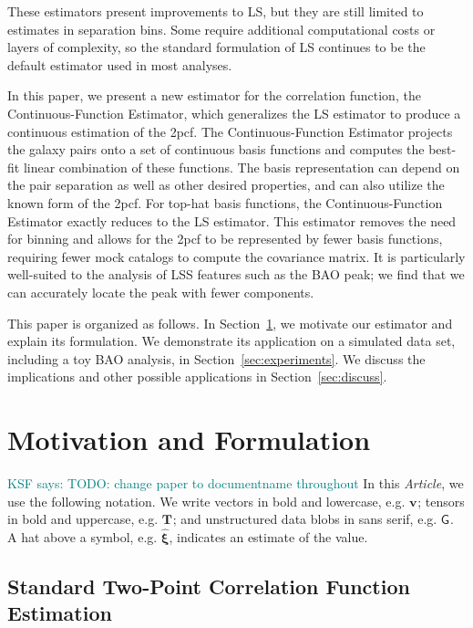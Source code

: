 \documentclass[modern]{aastex62}
\newcommand{\cf}{2pcf\xspace} %
\newcommand{\Est}{The Continuous-Function Estimator\xspace}
\newcommand{\est}{the Continuous-Function Estimator\xspace}
\newcommand{\LS}{LS\xspace}
\newcommand{\bld}[1]{\bm{#1}} %
\newcommand{\vv}[1]{\bld{v}_\mathrm{#1}}
\newcommand{\TT}[1]{\bld{T}_\mathrm{#1}}
\newcommand{\GG}[1]{\mathsf{G}_{#1}}
\newcommand{\KSF}[1]{\textcolor{teal}{KSF says: #1}}
\newcommand{\documentname}{\textsl{Article}}
\begin{document}
These estimators present improvements to \LS, but they are still limited to estimates in separation bins.
Some require additional computational costs or layers of complexity, so the standard formulation of \LS continues to be the default estimator used in most analyses.

In this paper, we present a new estimator for the correlation function, \est, which generalizes the \LS estimator to produce a continuous estimation of the \cf. 
\Est projects the galaxy pairs onto a set of continuous basis functions and computes the best-fit linear combination of these functions.
The basis representation can depend on the pair separation as well as other desired properties, and can also utilize the known form of the \cf.
For top-hat basis functions, \est exactly reduces to the \LS estimator. 
This estimator removes the need for binning and allows for the \cf to be represented by fewer basis functions, requiring fewer mock catalogs to compute the covariance matrix.
It is particularly well-suited to the analysis of LSS features such as the BAO peak; we find that we can accurately locate the peak with fewer components.

This paper is organized as follows. 
In Section~\ref{sec:motiv}, we motivate our estimator and explain its formulation.
We demonstrate its application on a simulated data set, including a toy BAO analysis, in Section~\ref{sec:experiments}.
We discuss the implications and other possible applications in Section~\ref{sec:discuss}. 

\section{Motivation and Formulation} 
\label{sec:motiv}

\KSF{TODO: change paper to documentname throughout}
In this \documentname, we use the following notation.
We write vectors in bold and lowercase, e.g. $\vv{}$; tensors in bold and uppercase, e.g. $\TT{}$; and unstructured data blobs in sans serif, e.g. $\GG{}$.
A hat above a symbol, e.g. $\bld{\hat{\xi}}$, indicates an estimate of the value.

\subsection{Standard Two-Point Correlation Function Estimation}
\end{document}
